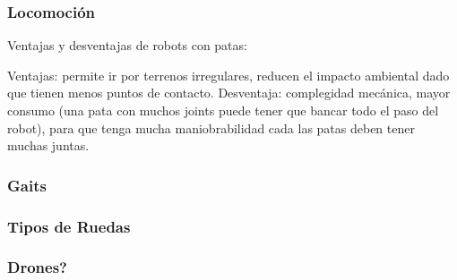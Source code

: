 \begin{frame}
    \frametitle{Locomoción}
    Ventajas y desventajas de robots con patas:
    
    Ventajas: permite ir por terrenos irregulares, reducen el impacto ambiental dado que tienen menos puntos de contacto.
    Desventaja: complegidad mecánica, mayor consumo (una pata con muchos joints puede tener que bancar todo el paso del robot), para que tenga mucha maniobrabilidad cada las patas deben tener muchas juntas.
    
\end{frame}


\begin{frame}
    \frametitle{Gaits}
    
\end{frame}


\begin{frame}
    \frametitle{Tipos de Ruedas}

\end{frame}

\begin{frame}
    \frametitle{Drones?}
    
\end{frame}